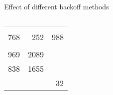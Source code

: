 \documentclass{beamer}
\begin{document}
\begin{frame}
\begin{block}{Effect of different backoff methods}
{\begin{columns}[T,totalwidth=\textwidth]
\begin{column}{0.425\textwidth}
\begin{tabular}{rrr}
                    \cellcolor{green!25}{751} & \cellcolor{green!25}{162}  & \cellcolor{green!25}{921}  \\
                    768 & 252  & 988  \\ 
         && \\
                    969 & 2089 & \cellcolor{green!25}{4}    \\   
                    838 & 1655 & \cellcolor{green!25}{4}    \\
                    \cellcolor{green!25}{581} & \cellcolor{green!25}{1155} & 32
        \end{tabular}
            \end{column}
        \end{columns}
        }
    \end{block}

\end{frame}
\end{document}
